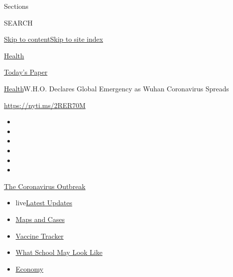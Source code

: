 Sections

SEARCH

\protect\hyperlink{site-content}{Skip to
content}\protect\hyperlink{site-index}{Skip to site index}

\href{https://www.nytimes.com/section/health}{Health}

\href{https://myaccount.nytimes.com/auth/login?response_type=cookie\&client_id=vi}{}

\href{https://www.nytimes.com/section/todayspaper}{Today's Paper}

\href{/section/health}{Health}\textbar{}W.H.O. Declares Global Emergency
as Wuhan Coronavirus Spreads

\url{https://nyti.ms/2RER70M}

\begin{itemize}
\item
\item
\item
\item
\item
\item
\end{itemize}

\href{https://www.nytimes.com/news-event/coronavirus?action=click\&pgtype=Article\&state=default\&region=TOP_BANNER\&context=storylines_menu}{The
Coronavirus Outbreak}

\begin{itemize}
\tightlist
\item
  live\href{https://www.nytimes.com/2020/08/02/world/coronavirus-updates.html?action=click\&pgtype=Article\&state=default\&region=TOP_BANNER\&context=storylines_menu}{Latest
  Updates}
\item
  \href{https://www.nytimes.com/interactive/2020/us/coronavirus-us-cases.html?action=click\&pgtype=Article\&state=default\&region=TOP_BANNER\&context=storylines_menu}{Maps
  and Cases}
\item
  \href{https://www.nytimes.com/interactive/2020/science/coronavirus-vaccine-tracker.html?action=click\&pgtype=Article\&state=default\&region=TOP_BANNER\&context=storylines_menu}{Vaccine
  Tracker}
\item
  \href{https://www.nytimes.com/interactive/2020/07/29/us/schools-reopening-coronavirus.html?action=click\&pgtype=Article\&state=default\&region=TOP_BANNER\&context=storylines_menu}{What
  School May Look Like}
\item
  \href{https://www.nytimes.com/live/2020/07/31/business/stock-market-today-coronavirus?action=click\&pgtype=Article\&state=default\&region=TOP_BANNER\&context=storylines_menu}{Economy}
\end{itemize}

